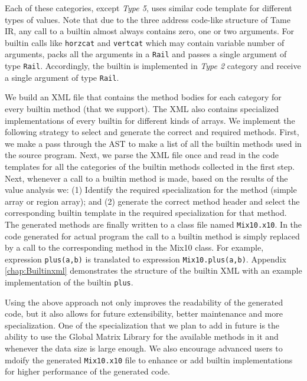 Each of these categories, except \emph{Type 5}, uses similar code template for
different types of values. Note that due to the three address code-like
structure of Tame IR, any call to a builtin almost always contains zero, one or
two arguments. For builtin calls like \texttt{horzcat} and \texttt{vertcat}
which may contain variable number of arguments, \mixten packs all the arguments
in a \texttt{Rail} and passes a single argument of type \texttt{Rail}.
Accordingly, the builtin is implemented in \emph{Type 2} category and receive a
single argument of type \texttt{Rail}.

We build an XML file that contains the method bodies for each category for
every builtin method (that we support). The XML also contains specialized
implementations of every builtin for different kinds of arrays.  We implement
the following strategy to select and generate the correct and required methods.
First, we make a pass through the AST to make a list of all the builtin methods
used in the source \matlab program. Next, we parse the XML file once and read
in the \xten code templates for all the categories of the builtin methods
collected in the first step. Next, whenever a call to a builtin method is made,
based on the results of the value analysis we: (1) Identify the required
specialization for the method (simple array or region array); and (2) generate
the correct method header and select the corresponding builtin template in the
required specialization for that method.  The generated methods are finally
written to a \xten class file named \verb|Mix10.x10|. In the code generated for
actual \matlab program the call to a builtin method is simply replaced by a
call to the corresponding method in the Mix10 class. For example, \matlab
expression \verb|plus(a,b)| is translated to \xten expression
\verb|Mix10.plus(a,b)|. Appendix \ref{chap:Builtinxml} demonstrates the
structure of the builtin XML with an example implementation of the builtin
\texttt{plus}. 

Using the above approach not only improves the readability of the generated
code, but it also allows for future extensibility, better maintenance and more
specialization. One of the specialization that we plan to add in future is the
ability to use the Global Matrix Library for the available methods in it and
whenever the data size is large enough. We also encourage advanced users to
mdoify the generated \texttt{Mix10.x10} file to enhance or add builtin
implementations for higher performance of the generated code. 

